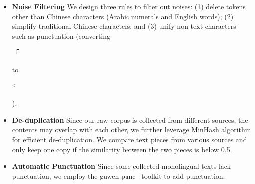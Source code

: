 \begin{itemize}[leftmargin=*]
\itemsep0em 
\item \textbf{Noise Filtering}
We design three rules to filter out noises: (1) delete tokens other than Chinese characters (\eg Arabic numerals and English words); (2) simplify traditional Chinese characters; and (3) unify non-text characters such as punctuation (\eg converting \begin{CJK*}{UTF8}{gbsn}「\end{CJK*} to \begin{CJK*}{UTF8}{gbsn}“\end{CJK*}).

\item \textbf{De-duplication}
Since our raw corpus is collected from different sources, \ie the contents may overlap with each other, we further leverage MinHash algorithm for efficient de-duplication. We compare text pieces from various sources and only keep one copy if the similarity between the two pieces is below 0.5.





\item \textbf{Automatic Punctuation}
Since some collected monolingual texts lack punctuation, we employ the guwen-punc~\cite{TP-toolbox-web} toolkit to add punctuation.



\end{itemize}



